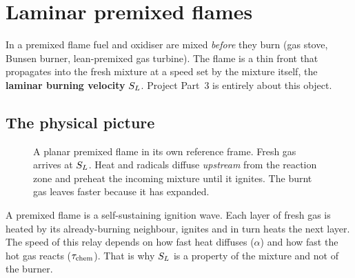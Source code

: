 \chapter{Laminar premixed flames}
\label{ch:premixed}

In a premixed flame fuel and oxidiser are mixed \emph{before} they burn (gas stove, Bunsen burner,
lean-premixed gas turbine). The flame is a thin front that propagates into the fresh mixture at a
speed set by the mixture itself, the \textbf{laminar burning velocity} $S_L$. Project Part~3 is
entirely about this object.

\section{The physical picture}

\begin{figure}[H]
\centering
{}
\caption{A planar premixed flame in its own reference frame. Fresh gas arrives at $S_L$. Heat and
radicals diffuse \emph{upstream} from the reaction zone and preheat the incoming mixture until it
ignites. The burnt gas leaves faster because it has expanded.}
\label{fig:planar}
\end{figure}

\begin{intuition}
A premixed flame is a self-sustaining ignition wave. Each layer of fresh gas is heated by its
already-burning neighbour, ignites and in turn heats the next layer. The speed of this relay
depends on how fast heat diffuses ($\alpha$) and how fast the hot gas reacts ($\tau_{\rm chem}$).
That is why $S_L$ is a property of the mixture and not of the burner.
\end{intuition}

